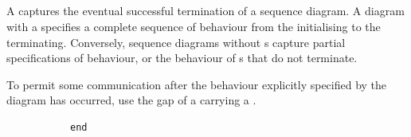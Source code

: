 \subsection{\mfinalaction}\label{ssec:metamodel-actions-final}

A \mfinalaction{} captures the eventual successful termination of a
sequence diagram.  A diagram with a \mfinalaction{} specifies a
complete sequence of behaviour from the \mtarget{} initialising to the
\mtarget{} terminating.  Conversely, sequence diagrams without
\mfinalaction s capture partial specifications of behaviour, or the
behaviour of \mtarget s that do not terminate.

\begin{remark}
To permit some communication after the behaviour explicitly specified by the
diagram has occurred, use the gap of a \mactionstep{} carrying a \mfinalaction.
\end{remark}

\begin{figure}[h!]

\begin{subfigure}[t]{\egtextwidth}
\begin{lstlisting}[style=Example]
end
\end{lstlisting}
\end{subfigure}
\hfill
\begin{subfigure}[t]{\eggraphicalwidth}
\gsecaption
\centering
{}
\end{subfigure}

\end{figure}

